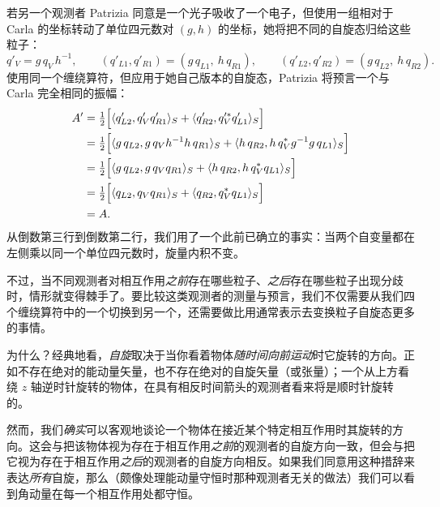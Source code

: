 若另一个观测者 Patrizia 同意是一个光子吸收了一个电子，但使用一组相对于 Carla 的坐标转动了单位四元数对 $(g,h)$ 的坐标，她将把不同的自旋态归给这些粒子：
\begin{equation*}
q'_V=g\,q_V\,h^{-1},\qquad
(q'_{L1},q'_{R1})=(g\,q_{L1},\ h\,q_{R1}),\qquad
(q'_{L2},q'_{R2})=(g\,q_{L2},\ h\,q_{R2}).
\end{equation*}
使用同一个缠绕算符，但应用于她自己版本的自旋态，Patrizia 将预言一个与 Carla 完全相同的振幅：
\begin{align*}
A' &= \tfrac12\Bigl[\langle q'_{L2},q'_V q'_{R1}\rangle_S+\langle q'_{R2},q'^*_V q'_{L1}\rangle_S\Bigr]\\
&= \tfrac12\Bigl[\langle g\,q_{L2},g\,q_V h^{-1}h\,q_{R1}\rangle_S+\langle h\,q_{R2},h\,q_V^* g^{-1}g\,q_{L1}\rangle_S\Bigr]\\
&= \tfrac12\Bigl[\langle g\,q_{L2},g\,q_V q_{R1}\rangle_S+\langle h\,q_{R2},h\,q_V^* q_{L1}\rangle_S\Bigr]\\
&= \tfrac12\Bigl[\langle q_{L2},q_V q_{R1}\rangle_S+\langle q_{R2},q_V^* q_{L1}\rangle_S\Bigr]\\
&= A .
\end{align*}
从倒数第三行到倒数第二行，我们用了一个此前已确立的事实：当两个自变量都在左侧乘以同一个单位四元数时，旋量内积不变。


不过，当不同观测者对相互作用\emph{之前}存在哪些粒子、\emph{之后}存在哪些粒子出现分歧时，情形就变得棘手了。要比较这类观测者的测量与预言，我们不仅需要从我们四个缠绕算符中的一个切换到另一个，还需要做比用通常表示去变换粒子自旋态更多的事情。

为什么？经典地看，\emph{自旋}取决于当你看着物体\emph{随时间向前运动}时它旋转的方向。正如不存在绝对的能动量矢量，也不存在绝对的自旋矢量（或张量）；一个从上方看绕 $z$ 轴逆时针旋转的物体，在具有相反时间箭头的观测者看来将是顺时针旋转的。

然而，我们\emph{确实}可以客观地谈论一个物体在接近某个特定相互作用时其旋转的方向。这会与把该物体视为存在于相互作用\emph{之前}的观测者的自旋方向一致，但会与把它视为存在于相互作用\emph{之后}的观测者的自旋方向相反。如果我们同意用这种措辞来表达\emph{所有}自旋，那么（颇像处理能动量守恒时那种观测者无关的做法）我们可以看到角动量在每一个相互作用处都守恒。

